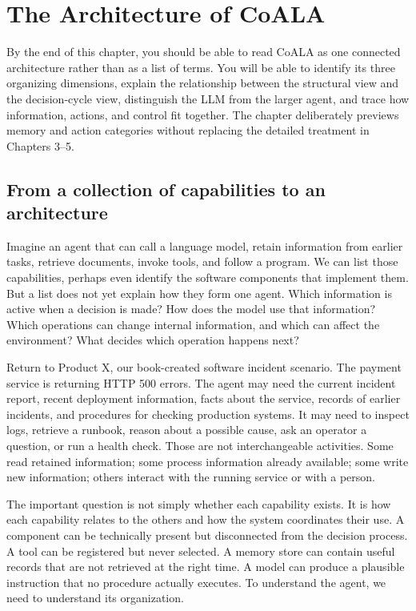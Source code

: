 \chapter{The Architecture of CoALA}
\label{ch:coala-architecture}

\begin{learningbox}
By the end of this chapter, you should be able to read CoALA as one connected architecture rather than as a list of terms. You will be able to identify its three organizing dimensions, explain the relationship between the structural view and the decision-cycle view, distinguish the LLM from the larger agent, and trace how information, actions, and control fit together. The chapter deliberately previews memory and action categories without replacing the detailed treatment in Chapters 3--5.
\end{learningbox}

\section{From a collection of capabilities to an architecture}

Imagine an agent that can call a language model, retain information from earlier tasks, retrieve documents, invoke tools, and follow a program. We can list those capabilities, perhaps even identify the software components that implement them. But a list does not yet explain how they form one agent. Which information is active when a decision is made? How does the model use that information? Which operations can change internal information, and which can affect the environment? What decides which operation happens next?

Return to Product X, our book-created software incident scenario. The payment service is returning HTTP 500 errors. The agent may need the current incident report, recent deployment information, facts about the service, records of earlier incidents, and procedures for checking production systems. It may need to inspect logs, retrieve a runbook, reason about a possible cause, ask an operator a question, or run a health check. Those are not interchangeable activities. Some read retained information; some process information already available; some write new information; others interact with the running service or with a person.

The important question is not simply whether each capability exists. It is how each capability relates to the others and how the system coordinates their use. A component can be technically present but disconnected from the decision process. A tool can be registered but never selected. A memory store can contain useful records that are not retrieved at the right time. A model can produce a plausible instruction that no procedure actually executes. To understand the agent, we need to understand its organization.

